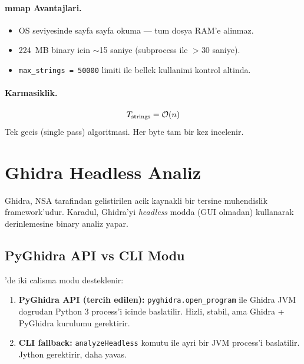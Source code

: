 \paragraph{mmap Avantajlari.}
\begin{itemize}
\item OS seviyesinde sayfa sayfa okuma --- tum dosya RAM'e alinmaz.
\item 224~MB binary icin $\sim$15 saniye (subprocess ile $>$30 saniye).
\item \texttt{max\_strings = 50000} limiti ile bellek kullanimi kontrol altinda.
\end{itemize}

\paragraph{Karmasiklik.}
\begin{equation}
\label{eq:strings-complexity}
T_{\text{strings}} = \mathcal{O}\!\left(n\right)
\end{equation}
Tek gecis (single pass) algoritmasi. Her byte tam bir kez incelenir.


\section{Ghidra Headless Analiz}
\label{sec:ghidra-headless}

Ghidra, NSA tarafindan gelistirilen acik kaynakli bir tersine muhendislik framework'udur. Karadul, Ghidra'yi \emph{headless} modda (GUI olmadan) kullanarak derinlemesine binary analiz yapar.

\subsection{PyGhidra API vs CLI Modu}

'de iki calisma modu desteklenir:

\begin{enumerate}
\item \textbf{PyGhidra API (tercih edilen):} \texttt{pyghidra.open\_program} ile Ghidra JVM dogrudan Python 3 process'i icinde baslatilir. Hizli, stabil, ama Ghidra + PyGhidra kurulumu gerektirir.
\item \textbf{CLI fallback:} \texttt{analyzeHeadless} komutu ile ayri bir JVM process'i baslatilir. Jython gerektirir, daha yavas.
\end{enumerate}

